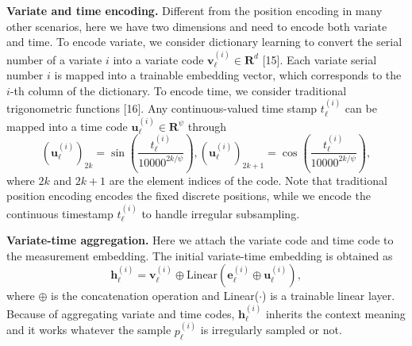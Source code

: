 \documentclass[twocolumn]{article}
\begin{document}
\textbf{Variate and time encoding.} Different from the position encoding in many other scenarios, here we have two dimensions and need to encode both variate and time. To encode variate, we consider dictionary learning to convert the serial number of a variate $i$ into a variate code $\mathbf{v}_\ell^{(i)} \in \mathbf{R}^d$ [15]. Each variate serial number $i$ is mapped into a trainable embedding vector, which corresponds to the $i$-th column of the dictionary. To encode time, we consider traditional trigonometric functions [16]. Any continuous-valued time stamp $t_\ell^{(i)}$ can be mapped into a time code $\mathbf{u}_\ell^{(i)} \in \mathbf{R}^\psi$ through
\begin{equation}
    (\mathbf{u}_\ell^{(i)})_{2k} = \sin(\frac{t_\ell^{(i)}}{10000^{2k/\psi}}), (\mathbf{u}_\ell^{(i)})_{2k+1} = \cos(\frac{t_\ell^{(i)}}{10000^{2k/\psi}}),
    \label{eq:2}
\end{equation}
where $2k$ and $2k+1$ are the element indices of the code. Note that traditional position encoding encodes the fixed discrete positions, while we encode the continuous timestamp $t_\ell^{(i)}$ to handle irregular subsampling.

\textbf{Variate-time aggregation.} Here we attach the variate code and time code to the measurement embedding. The initial variate-time embedding is obtained as
\begin{equation*}
    \mathbf{h}_\ell^{(i)} = \mathbf{v}_\ell^{(i)} \oplus \text{Linear}(\mathbf{e}_\ell^{(i)} \oplus \mathbf{u}_\ell^{(i)}),
\end{equation*}
where $\oplus$ is the concatenation operation and Linear($\cdot$) is a trainable linear layer. Because of aggregating variate and time codes, $\mathbf{h}_\ell^{(i)}$ inherits the context meaning and it works whatever the sample $p_\ell^{(i)}$ is irregularly sampled or not.
\end{document}
